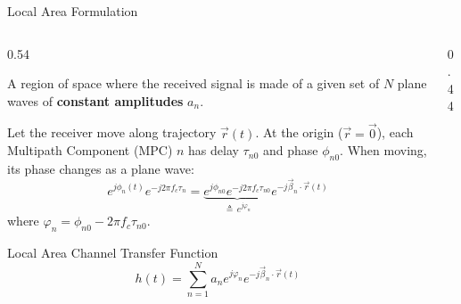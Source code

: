 \documentclass[aspectratio=169, 10pt]{beamer}
\begin{document}
\begin{frame}{Local Area Formulation}
\small
    \begin{columns}[T]
        \begin{column}{0.54\textwidth}
        \vspace{-1.2em}
            \begin{definition}
                A region of space where the received signal is made of a given set of $N$ plane waves of \textbf{constant amplitudes} $a_n$.
            \end{definition}
            
            Let the receiver move along trajectory $\vec{r}(t)$.
            At the origin ($\vec{r} = \vec{0}$), each Multipath Component (MPC) $n$ has delay $\tau_{n0}$ and phase $\phi_{n0}$.
            When moving, its phase changes as a plane wave:
            \begin{equation}
                e^{j\phi_n(t)} e^{-j2\pi f_c \tau_n} = \underbrace{e^{j\phi_{n0}} e^{-j2\pi f_c \tau_{n0}}}_{\triangleq \, e^{j\varphi_n}} e^{-j\vec{\beta}_n \cdot \vec{r}(t)}
            \end{equation}
            where $\varphi_n = \phi_{n0} - 2\pi f_c \tau_{n0}$.

            \begin{block}{Local Area Channel Transfer Function}
                \begin{equation}
                    \boxed{h(t) = \sum_{n=1}^{N} a_n e^{j\varphi_n} e^{-j\vec{\beta}_n \cdot \vec{r}(t)}}
                \end{equation}
            \end{block}
        \end{column}

        \begin{column}{0.44\textwidth}
            \begin{center}
\end{center}
\end{column}
\end{columns}
\end{frame}
\end{document}

